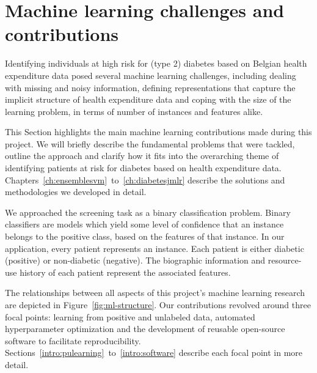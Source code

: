 \section{Machine learning challenges and contributions} \label{intro:machine-learning}
Identifying individuals at high risk for (type 2) diabetes based on Belgian health expenditure data posed several machine learning challenges, including dealing with missing and noisy information, defining representations that capture the implicit structure of health expenditure data and coping with the size of the learning problem, in terms of number of instances and features alike.

This Section highlights the main machine learning contributions made during this project. We will briefly describe the fundamental problems that were tackled, outline the approach and clarify how it fits into the overarching theme of identifying patients at risk for diabetes based on health expenditure data. Chapters~\ref{ch:ensemblesvm}~to~\ref{ch:diabetesjmlr} describe the solutions and methodologies we developed in detail.

We approached the screening task as a binary classification problem. Binary classifiers are models which yield some level of confidence that an instance belongs to the positive class, based on the features of that instance. In our application, every patient represents an instance. Each patient is either diabetic (positive) or non-diabetic (negative). The biographic information and resource-use history of each patient represent the associated features.

The relationships between all aspects of this project's machine learning research are depicted in Figure~\ref{fig:ml-structure}. Our contributions revolved around three focal points: learning from positive and unlabeled data, automated hyperparameter optimization and the development of reusable open-source software to facilitate reproducibility. Sections~\ref{intro:pulearning}~to~\ref{intro:software} describe each focal point in more detail.

